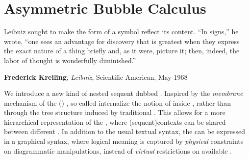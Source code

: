 \setchapterpreamble[u]{\margintoc}
\chapter{Asymmetric Bubble Calculus}

\epigraph{Leibniz sought to make the form of a symbol reflect its content. ``In
signs,'' he wrote, ``one sees an advantage for discovery that is greatest when
they express the exact nature of a thing briefly and, as it were, picture it;
then, indeed, the labor of thought is wonderfully diminished.''}
{\textbf{Frederick Kreiling}, \textit{Leibniz}, Scientific American, May 1968}


We introduce a new kind of nested sequent  dubbed . Inspired by the \emph{membrane} mechanism of the  (\reintro{\cham}) ,
so-called  internalize the notion of  inside
, rather than through the tree structure induced by traditional
. This allows for a more hierarchical representation of the
, where \kl(sequent){contexts} can be shared between different
. In addition to the usual textual syntax, the 
can be expressed in a graphical syntax, where logical meaning is captured by
\emph{physical} constraints on diagrammatic manipulations, instead of
\emph{virtual} restrictions on available .


